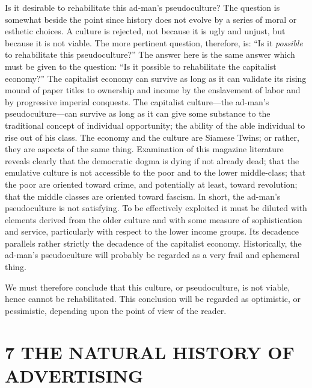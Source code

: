 \documentclass[openany,nobib]{tufte-book}
\let\oldchapter\chapter
\def\chapter{%
  \setcounter{footnote}{0}%
  \oldchapter
}
\begin{document}
Is it desirable to rehabilitate this ad-man's pseudoculture? The
question is somewhat beside the point since history does not evolve by a
series of moral or esthetic choices. A culture is rejected, not because
it is ugly and unjust, but because it is not viable. The more pertinent
question, therefore, is: ``Is it \emph{possible} to rehabilitate this
pseudoculture?'' The answer here is the same answer which must be given
to the question: ``Is it possible to rehabilitate the capitalist
economy?'' The capitalist economy can survive as long as it can validate
its rising mound of paper titles to ownership and income by the
enslavement of labor and by progressive imperial conquests. The
capitalist culture---the ad-man's pseudoculture---can survive as long as
it can give some substance to the traditional concept of individual
opportunity; the ability of the able individual to rise out of his
class. The economy and the culture are Siamese Twins; or rather, they
are aspects of the same thing. Examination of this magazine literature
reveals clearly that the democratic dogma is dying if not already dead;
that the emulative culture is not accessible to the poor and to the
lower middle-class; that the poor are oriented toward crime, and
potentially at least, toward revolution; that the middle classes are
oriented toward fascism. In short, the ad-man's pseudoculture is not
satisfying. To be effectively exploited it must be diluted with elements
derived from the older culture and with some measure of sophistication
and service, particularly with respect to the lower income groups. Its
decadence parallels rather strictly the decadence of the capitalist
economy. Historically, the ad-man's pseudoculture will probably be
regarded as a very frail and ephemeral thing.

We must therefore conclude that this culture, or pseudoculture, is not
viable, hence cannot be rehabilitated. This conclusion will be regarded
as optimistic, or pessimistic, depending upon the point of view of the
reader.



\chapter[7 \hspace*{1mm} THE NATURAL HISTORY OF ADVERTISING]{7 THE NATURAL HISTORY OF ADVERTISING}
\end{document}
